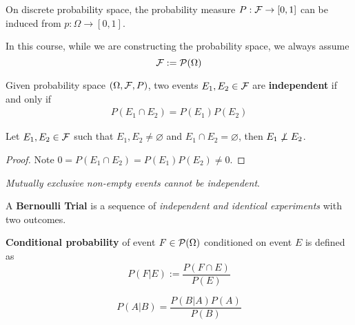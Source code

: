 \documentclass{article}
\begin{document}
		\begin{proposition}
			On discrete probability space, the probability measure $P: \mathcal{{F}} \to [0, 1]$ can be induced from $p: \Omega \to [0, 1]$.
		\end{proposition}
		
		\begin{assumption}
			In this course, while we are constructing the probability space, we always assume 
			\begin{equation}
				\mathcal{{F}} := \mathcal{{P}}(\Omega)
			\end{equation}
		\end{assumption}
		
		\begin{definition}
			Given probability space $(\Omega, \mathcal{{F}}, P)$, two events $E_1, E_2 \in \mathcal{{F}}$ are \textbf{independent} if and only if 
			\begin{gather}
				P(E_1 \cap E_2) = P(E_1) P(E_2)
			\end{gather}
		\end{definition}
		
		\begin{proposition}
			Let $E_1, E_2 \in \mathcal{{F}}$ such that $E_1, E_2 \neq \varnothing$ and $E_1 \cap E_2 = \varnothing$, then $E_1 \centernot \perp E_2$.
			\begin{proof}
				Note $0 = P(E_1 \cap E_2) = P(E_1)P(E_2) \neq 0$.
			\end{proof}
			\emph{Mutually exclusive non-empty events cannot be independent}.
		\end{proposition}
		
		\begin{definition}
			A \textbf{Bernoulli Trial} is a sequence of \emph{independent and identical experiments} with two outcomes.
		\end{definition}
		
		\begin{definition}
			\textbf{Conditional probability} of event $F \in \mathcal{{P}}(\Omega)$ conditioned on event $E$ is defined as 
			\begin{equation}
				P(F|E) := \frac{P(F \cap E)}{P(E)}
			\end{equation}
		\end{definition}
		
		\begin{theorem}
			\begin{equation}
				P(A|B) = \frac{P(B|A)P(A)}{P(B)}
			\end{equation}
		\end{theorem}
		
\end{document}
